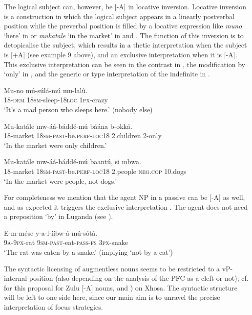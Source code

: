 \documentclass[output=paper]{langsci/langscibook}
\begin{document}
The logical subject can, however, be [-A] in locative inversion. Locative inversion is a construction in which the logical subject appears in a linearly postverbal position while the preverbal position is filled by a locative expression like \textit{muno} ‘here’ in  or \textit{mukatale} ‘in the market’ in  and . The function of this inversion is to detopicalise the subject, which results in a thetic interpretation when the subject is [+A] (see example 9 above), and an exclusive interpretation when it is [-A]. This exclusive interpretation can be seen in the contrast in , the modification by ‘only’ in , and the generic or type interpretation of the indefinite in .

\ea\label{ex:vanderwal:35}
\gll   Mu-no    mú-súlá-mú    mu-lalû.\\
       18-\textsc{dem}  \textsc{18sm}-sleep-\textsc{18loc}  \textsc{1px}-crazy\\
\glt   ‘It’s a mad person who sleeps here.’ (nobody else)
\z

\ea\label{ex:vanderwal:36}
\gll   Mu-katále  mw-áá-báddé-mú      báána    b-okká.\\
       18-market  \textsc{18sm}-\textsc{past}-be.\textsc{perf}-\textsc{loc18}  2.children  2-only\\
\glt   ‘In the market were only children.’
\z

\ea\label{ex:vanderwal:37}
\gll   Mu-katále  mw-áá-báddé-mú    baantú,    si    mbwa.\\
       18-market  \textsc{18sm}-\textsc{past}-be.\textsc{perf}-\textsc{loc18}  2.people  \textsc{neg}.\textsc{cop}  10.dogs\\
\glt   ‘In the market were people, not dogs.’
\z

For completeness we mention that the agent NP in a passive can be [-A] as well, and as expected it triggers the exclusive interpretation . The agent does not need a preposition ‘by’ in Luganda (see \citealt{Pak2008}).

\ea\label{ex:vanderwal:38}
\gll   E-m-mése  y-a-l-ííbw-á      mú-sótâ.\\
       \textsc{9a}-\textsc{9px}-rat  \textsc{9sm}-\textsc{past}-eat-\textsc{pass}-\textsc{fs}  \textsc{3px}-snake\\
\glt   ‘The rat was eaten by a snake.’ (implying ‘not by a cat’)
\z

The syntactic licensing of augmentless nouns seems to be restricted to a vP-internal position (also depending on the analysis of the PFC as a cleft or not); cf. \citet{Halpert2012,Halpert2013} for this proposal for Zulu [-A] nouns, and \citealt{CarstensMletshe2013,CarstensMletshe2015}) on Xhosa. The syntactic structure will be left to one side here, since our main aim is to unravel the precise interpretation of focus strategies.
\end{document}
